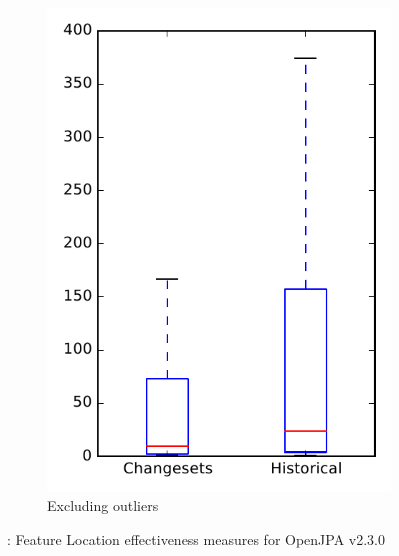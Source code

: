 \begin{figure}
\begin{subfigure}{.4\textwidth}
        \includegraphics[height=0.4\textheight]{figures/flt/rq2_openjpa_no_outlier}
        \caption{Excluding outliers}\label{fig:flt:rq2:openjpa_no_outlier}
    \end{subfigure}
\caption{\ftwo: Feature Location effectiveness measures for OpenJPA v2.3.0}
\label{fig:flt:rq2:openjpa}
\end{figure}
